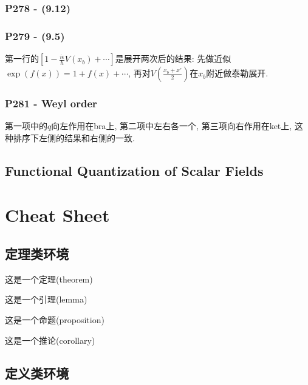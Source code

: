 \documentclass[cn,hazy,blue,11pt,device=normal,chinesefont=founder]{elegantnote}
\begin{document}
\subsubsection{P278 - (9.12)}

\subsubsection{P279 - (9.5)}

第一行的$[1-\frac{i\epsilon}{\hbar}V(x_b)+\cdots]$是展开两次后的结果: 先做近似$\exp(f(x)) = 1 + f(x) + \cdots$, 再对$V(\frac{x_b + x'}{2})$在$x_b$附近做泰勒展开.  

\subsubsection{P281 - Weyl order}

第一项中的$q$向左作用在bra上, 第二项中左右各一个, 第三项向右作用在ket上, 这种排序下左侧的结果和右侧的一致. 

\subsection{Functional Quantization of Scalar Fields}



\clearpage

\section{Cheat Sheet}

\subsection{定理类环境}

\begin{theorem}[名称]
  这是一个定理(theorem)
\end{theorem}

\begin{lemma}[名称]
  这是一个引理(lemma)
\end{lemma}

\begin{proposition}[名称]
  这是一个命题(proposition)
\end{proposition}

\begin{corollary}[名称]
  这是一个推论(corollary)
\end{corollary}

\subsection{定义类环境}
\end{document}
